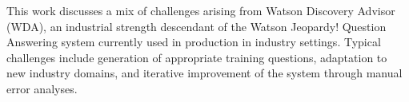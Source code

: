 This work discusses a mix of challenges arising from Watson Discovery Advisor (WDA), an industrial strength descendant of the Watson Jeopardy! Question Answering system currently used in production in industry settings. Typical challenges include generation of appropriate training questions, adaptation to new industry domains, and iterative improvement of the system through manual error analyses.
